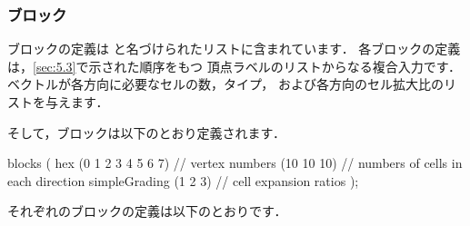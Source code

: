 \subsubsection{ブロック}
\label{sssec:5.3.1.3}
ブロックの定義は
%
%
と名づけられたリストに含まれています．
各ブロックの定義は，\autoref{sec:5.3}で示された順序をもつ
頂点ラベルのリストからなる複合入力です．
ベクトルが各方向に必要なセルの数，タイプ，
および各方向のセル拡大比のリストを与えます．

そして，ブロックは以下のとおり定義されます．
\begin{OFverbatim}[file]
blocks
(
    hex (0 1 2 3 4 5 6 7) // vertex numbers
    (10 10 10) // numbers of cells in each direction
    simpleGrading (1 2 3) // cell expansion ratios
);
\end{OFverbatim}
それぞれのブロックの定義は以下のとおりです．
